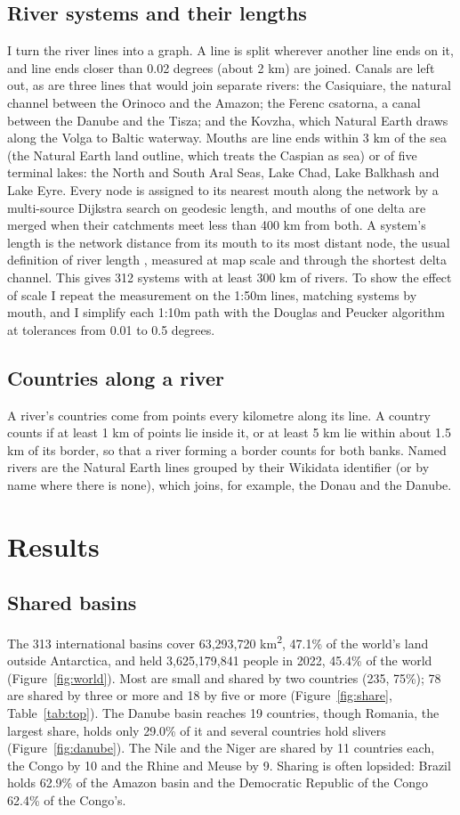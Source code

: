 \documentclass[11pt,a4paper]{article}
\begin{document}
\subsection{River systems and their lengths}
I turn the river lines into a graph. A line is split wherever another line ends on it, and line ends closer than 0.02 degrees (about 2 km) are joined. Canals are left out, as are three lines that would join separate rivers: the Casiquiare, the natural channel between the Orinoco and the Amazon; the Ferenc csatorna, a canal between the Danube and the Tisza; and the Kovzha, which Natural Earth draws along the Volga to Baltic waterway. Mouths are line ends within 3 km of the sea (the Natural Earth land outline, which treats the Caspian as sea) or of five terminal lakes: the North and South Aral Seas, Lake Chad, Lake Balkhash and Lake Eyre. Every node is assigned to its nearest mouth along the network by a multi-source Dijkstra search on geodesic length, and mouths of one delta are merged when their catchments meet less than 400 km from both. A system's length is the network distance from its mouth to its most distant node, the usual definition of river length \citep{brit_nile}, measured at map scale and through the shortest delta channel. This gives 312 systems with at least 300 km of rivers. To show the effect of scale I repeat the measurement on the 1:50m lines, matching systems by mouth, and I simplify each 1:10m path with the Douglas and Peucker algorithm \citep{douglas1973} at tolerances from 0.01 to 0.5 degrees.

\subsection{Countries along a river}
A river's countries come from points every kilometre along its line. A country counts if at least 1 km of points lie inside it, or at least 5 km lie within about 1.5 km of its border, so that a river forming a border counts for both banks. Named rivers are the Natural Earth lines grouped by their Wikidata identifier (or by name where there is none), which joins, for example, the Donau and the Danube.

\section{Results}
\subsection{Shared basins}
The 313 international basins cover 63,293,720 km\textsuperscript{2}, 47.1\% of the world's land outside Antarctica, and held 3,625,179,841 people in 2022, 45.4\% of the world (Figure~\ref{fig:world}). Most are small and shared by two countries (235, 75\%); 78 are shared by three or more and 18 by five or more (Figure~\ref{fig:share}, Table~\ref{tab:top}). The Danube basin reaches 19 countries, though Romania, the largest share, holds only 29.0\% of it and several countries hold slivers (Figure~\ref{fig:danube}). The Nile and the Niger are shared by 11 countries each, the Congo by 10 and the Rhine and Meuse by 9. Sharing is often lopsided: Brazil holds 62.9\% of the Amazon basin and the Democratic Republic of the Congo 62.4\% of the Congo's.
\end{document}
